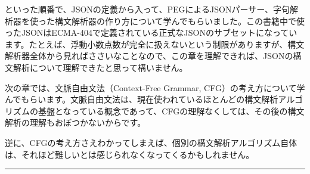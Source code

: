 \noindent といった順番で、JSONの定義から入って、PEGによるJSONパーサー、字句解析器を使った構文解析器の作り方について学んでもらいました。この書籍中で使ったJSONはECMA-404で定義されている正式なJSONのサブセットになっています。たとえば、浮動小数点数が完全に扱えないという制限がありますが、構文解析器全体から見ればささいなことなので、この章を理解できれば、JSONの構文解析について理解できたと思って構いません。

次の章では、文脈自由文法（Context-Free Grammar,
CFG）の考え方について学んでもらいます。文脈自由文法は、現在使われているほとんどの構文解析アルゴリズムの基盤となっている概念であって、CFGの理解なくしては、その後の構文解析の理解もおぼつかないからです。

逆に、CFGの考え方さえわかってしまえば、個別の構文解析アルゴリズム自体は、それほど難しいとは感じられなくなってくるかもしれません。

\begin{center}\rule{0.5\linewidth}{0.5pt}\end{center}


